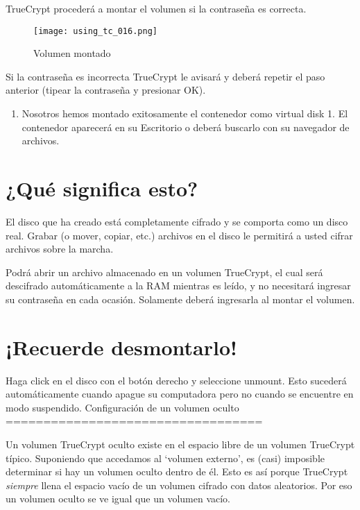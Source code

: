 \documentclass[10pt,a5paper,twoside,,]{book}
\providecommand{\tightlist}{%
  \setlength{\itemsep}{0pt}\setlength{\parskip}{0pt}}
\begin{document}
TrueCrypt procederá a montar el volumen si la contraseña es correcta.

\begin{figure}[htbp]
\centering
\texttt{[image: using\_tc\_016.png]}
\caption{Volumen montado}
\end{figure}

Si la contraseña es incorrecta TrueCrypt le avisará y deberá repetir el
paso anterior (tipear la contraseña y presionar OK).

\begin{enumerate}
\def\labelenumi{\arabic{enumi}.}
\setcounter{enumi}{6}
\tightlist
\item
  Nosotros hemos montado exitosamente el contenedor como virtual disk 1.
  El contenedor aparecerá en su Escritorio o deberá buscarlo con su
  navegador de archivos.
\end{enumerate}

\section{¿Qué significa esto?}\label{quuxe9-significa-esto}

El disco que ha creado está completamente cifrado y se comporta como un
disco real. Grabar (o mover, copiar, etc.) archivos en el disco le
permitirá a usted cifrar archivos sobre la marcha.

Podrá abrir un archivo almacenado en un volumen TrueCrypt, el cual será
descifrado automáticamente a la RAM mientras es leído, y no necesitará
ingresar su contraseña en cada ocasión. Solamente deberá ingresarla al
montar el volumen.

\section{¡Recuerde desmontarlo!}\label{recuerde-desmontarlo}

Haga click en el disco con el botón derecho y seleccione unmount. Esto
sucederá automáticamente cuando apague su computadora pero no cuando se
encuentre en modo suspendido. Configuración de un volumen oculto
==================================

Un volumen TrueCrypt oculto existe en el espacio libre de un volumen
TrueCrypt típico. Suponiendo que accedamos al `volumen externo', es
(casi) imposible determinar si hay un volumen oculto dentro de él. Esto
es así porque TrueCrypt \emph{siempre} llena el espacio vacío de un
volumen cifrado con datos aleatorios. Por eso un volumen oculto se ve
igual que un volumen vacío.
\end{document}
